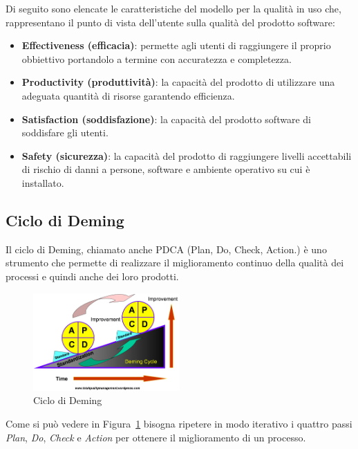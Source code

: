 Di seguito sono elencate le caratteristiche del modello per la qualità in uso che, rappresentano il punto di vista dell'utente sulla qualità del prodotto software:

\begin{itemize}
	\item \textbf{Effectiveness (efficacia)}:  permette agli utenti di raggiungere il proprio obbiettivo portandolo a termine con accuratezza e completezza.

	\item \textbf{Productivity (produttività)}: la capacità del prodotto di utilizzare una adeguata quantità di risorse garantendo efficienza.

	\item \textbf{Satisfaction (soddisfazione)}: la capacità del prodotto software di soddisfare gli utenti.

	\item \textbf{Safety (sicurezza)}: la capacità del prodotto di raggiungere livelli accettabili di rischio di danni a persone, software e ambiente operativo su cui è installato.
\end{itemize}

\subsection{Ciclo di Deming}
Il ciclo di Deming, chiamato anche PDCA (Plan, Do, Check, Action.) è uno strumento che permette di realizzare il miglioramento continuo della qualità dei processi e quindi anche dei loro prodotti.

\begin{figure}[h!]
	\centering
	\includegraphics[width=0.50\textwidth]{img/deming.png}
	\caption{Ciclo di Deming}
	\label{fig:PDCA}
\end{figure}

Come si può vedere in Figura~\ref{fig:PDCA} bisogna ripetere in modo iterativo i quattro passi \emph{Plan}, \emph{Do}, \emph{Check} e \emph{Action} per ottenere il miglioramento di un processo.

